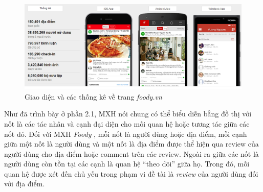 \documentclass[12pt]{extarticle}
\begin{document}
			\begin{figure}[h!]
				\includegraphics[width=\linewidth]{foody}
				\caption{Giao diện và các thống kê về trang \textit{foody.vn}}
				\label{fig:foody}
			\end{figure}

			\par Như đã trình bày ở phần 2.1, MXH nói chung có thể biểu diễn bằng đồ thị với nốt là các tác nhân và cạnh đại diện cho mối quan hệ hoặc tương tác giữa các nốt đó. Đối với MXH \textit{Foody} , mỗi nốt là người dùng hoặc địa điểm, mỗi cạnh giữa một nốt là người dùng và một nốt là địa điểm được thể hiện qua review của người dùng cho địa điểm hoặc comment trên các review. Ngoài ra giữa các nốt là người dùng còn tồn tại các cạnh là quan hệ “theo dõi” giữa họ. Trong đó, mối quan hệ được xét đến chủ yếu trong phạm vi đề tài là \textit{review} của người dùng đối với địa điểm.
\end{document}
